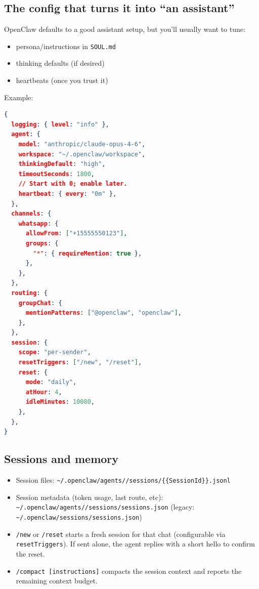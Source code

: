 \subsection{The config that turns it into “an assistant”}


OpenClaw defaults to a good assistant setup, but you’ll usually want to tune:

\begin{itemize}
  \item persona/instructions in \texttt{SOUL.md}
  \item thinking defaults (if desired)
  \item heartbeats (once you trust it)
\end{itemize}


Example:

\begin{lstlisting}[language=json]
{
  logging: { level: "info" },
  agent: {
    model: "anthropic/claude-opus-4-6",
    workspace: "~/.openclaw/workspace",
    thinkingDefault: "high",
    timeoutSeconds: 1800,
    // Start with 0; enable later.
    heartbeat: { every: "0m" },
  },
  channels: {
    whatsapp: {
      allowFrom: ["+15555550123"],
      groups: {
        "*": { requireMention: true },
      },
    },
  },
  routing: {
    groupChat: {
      mentionPatterns: ["@openclaw", "openclaw"],
    },
  },
  session: {
    scope: "per-sender",
    resetTriggers: ["/new", "/reset"],
    reset: {
      mode: "daily",
      atHour: 4,
      idleMinutes: 10080,
    },
  },
}
\end{lstlisting}


\subsection{Sessions and memory}


\begin{itemize}
  \item Session files: \texttt{\textasciitilde{}/.openclaw/agents//sessions/\{\{SessionId\}\}.jsonl}
  \item Session metadata (token usage, last route, etc): \texttt{\textasciitilde{}/.openclaw/agents//sessions/sessions.json} (legacy: \texttt{\textasciitilde{}/.openclaw/sessions/sessions.json})
  \item \texttt{/new} or \texttt{/reset} starts a fresh session for that chat (configurable via \texttt{resetTriggers}). If sent alone, the agent replies with a short hello to confirm the reset.
  \item \texttt{/compact [instructions]} compacts the session context and reports the remaining context budget.
\end{itemize}



